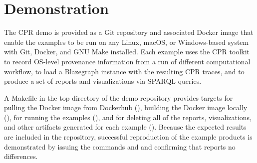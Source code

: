 \section{Demonstration}

The CPR demo is provided as a Git repository and associated Docker image that enable the examples to be run on any Linux, macOS, or Windows-based system with Git, Docker, and GNU Make installed. Each example uses the CPR toolkit to record OS-level provenance information from a run of different computational workflow, to load a Blazegraph instance with the resulting CPR traces, and to produce a set of reports and visualizations via SPARQL queries.
 
A Makefile in the top directory of the demo repository provides targets for pulling the Docker image from Dockerhub (), building the Docker image locally (), for running the examples (), and for deleting all of the reports, visualizations, and other artifacts generated for each example (). Because the expected results are included in the repository, successful reproduction of the example products is demonstrated by issuing the commands  and  and confirming that  reports no differences.

